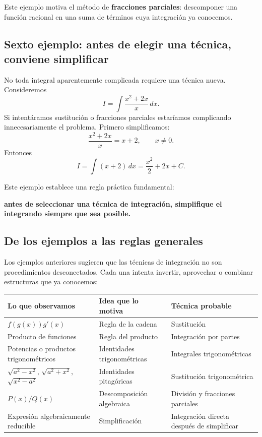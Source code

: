 \documentclass[12pt]{article}
\theoremstyle{definition}\newtheorem{definicion}[teorema]{Definición}\newtheorem{ejemplo}[teorema]{Ejemplo}\newtheorem{ejercicio}[teorema]{Ejercicio}
\theoremstyle{remark}\newtheorem*{observacion}{Observación}\newtheorem*{advertencia}{Advertencia}\newtheorem*{estrategia}{Estrategia}
\begin{document}
Este ejemplo motiva el método de \textbf{fracciones parciales}: descomponer una función racional en una suma de términos cuya integración ya conocemos.

\subsection{Sexto ejemplo: antes de elegir una técnica, conviene simplificar}
No toda integral aparentemente complicada requiere una técnica nueva. Consideremos
\[
I=\int\frac{x^2+2x}{x}\,dx.
\]
Si intentáramos sustitución o fracciones parciales estaríamos complicando innecesariamente el problema. Primero simplificamos:
\[
\frac{x^2+2x}{x}=x+2,\qquad x\neq0.
\]
Entonces
\[
I=\int(x+2)\,dx
=\boxed{\frac{x^2}{2}+2x+C}.
\]

Este ejemplo establece una regla práctica fundamental:
\begin{center}
\textbf{antes de seleccionar una técnica de integración, simplifique el integrando siempre que sea posible.}
\end{center}

\subsection{De los ejemplos a las reglas generales}
Los ejemplos anteriores sugieren que las técnicas de integración no son procedimientos desconectados. Cada una intenta invertir, aprovechar o combinar estructuras que ya conocemos:

\begin{center}
\begin{tabular}{p{}p{}p{}}
\toprule
\textbf{Lo que observamos} & \textbf{Idea que lo motiva} & \textbf{Técnica probable}\\
\midrule
$f(g(x))g'(x)$ & Regla de la cadena & Sustitución\\
Producto de funciones & Regla del producto & Integración por partes\\
Potencias o productos trigonométricos & Identidades trigonométricas & Integrales trigonométricas\\
$\sqrt{a^2-x^2}$, $\sqrt{a^2+x^2}$, $\sqrt{x^2-a^2}$ & Identidades pitagóricas & Sustitución trigonométrica\\
$P(x)/Q(x)$ & Descomposición algebraica & División y fracciones parciales\\
Expresión algebraicamente reducible & Simplificación & Integración directa después de simplificar\\
\bottomrule
\end{tabular}
\end{center}
\end{document}
